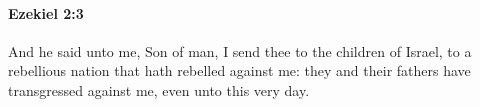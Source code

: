 
		\paragraph{Ezekiel 2:3} %
			\label{EZEKIEL-2-3}

			And he said unto me, Son of man, I send thee to the children of Israel, to a rebellious nation that hath rebelled against me: they and their fathers have transgressed against me, even unto this very day.


